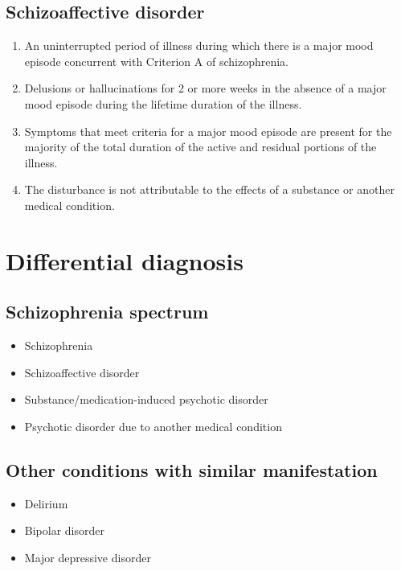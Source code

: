 \documentclass{article}
\begin{document}
\subsection{Schizoaffective disorder}
\begin{enumerate}
    \item An uninterrupted period of illness during which there is a major
        mood episode concurrent with Criterion A of schizophrenia.
    \item Delusions or hallucinations for 2 or more weeks in the absence of
        a major mood episode during the lifetime duration of the illness.
    \item Symptoms that meet criteria for a major mood episode are present
        for the majority of the total duration of the active and residual
        portions of the illness.
    \item The disturbance is not attributable to the effects of a substance
        or another medical condition.
\end{enumerate}

\section{Differential diagnosis}
\subsection{Schizophrenia spectrum}
\begin{itemize}
    \item Schizophrenia
    \item Schizoaffective disorder
    \item Substance/medication-induced psychotic disorder
    \item Psychotic disorder due to another medical condition
\end{itemize}

\subsection{Other conditions with similar manifestation}
\begin{itemize}
    \item Delirium
    \item Bipolar disorder
    \item Major depressive disorder
\end{itemize}
\end{document}
